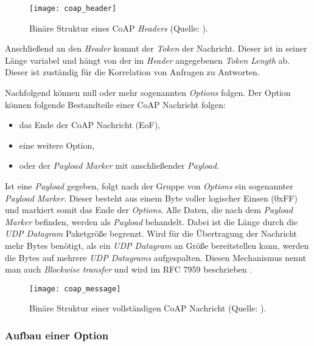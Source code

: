 \begin{figure}[h]
    \centering
    \texttt{[image: coap\_header]}
    \caption{Binäre Struktur eines CoAP \textit{Headers} (Quelle: \autocite{RFC7252}).}
    \label{fig:binaere-sturktur-eines-coap-headers}
\end{figure}

Anschließend an den \textit{Header} kommt der \textit{Token} der Nachricht. Dieser ist in seiner Länge variabel und hängt von der im \textit{Header} angegebenen \textit{Token Length} ab. Dieser ist zuständig für die Korrelation von Anfragen zu Antworten.

Nachfolgend können null oder mehr sogenannten \textit{Options} folgen. Der Option können folgende Bestandteile einer CoAP Nachricht folgen:
\begin{itemize}
    \item das Ende der CoAP Nachricht (EoF),
    \item eine weitere Option,
    \item oder der \textit{Payload Marker} mit anschließender \textit{Payload}.
\end{itemize}

Ist eine \textit{Payload} gegeben, folgt nach der Gruppe von \textit{Options} ein sogenannter \textit{Payload Marker}. Dieser besteht aus einem Byte voller logischer Einsen (0xFF) und markiert somit das Ende der \textit{Options}. Alle Daten, die nach dem \textit{Payload Marker} befinden, werden als \textit{Payload} behandelt. Dabei ist die Länge durch die \textit{UDP Datagram} Paketgröße begrenzt. Wird für die Übertragung der Nachricht mehr Bytes benötigt, als ein \textit{UDP Datagram} an Größe bereitstellen kann, werden die Bytes auf mehrere \textit{UDP Datagrams} aufgespalten. Diesen Mechanismus nennt man auch \textit{Blockwise transfer} und wird im RFC 7959 beschrieben \autocite{RFC7959}.

\begin{figure}[h]
    \centering
    \texttt{[image: coap\_message]}
    \caption{Binäre Struktur einer vollständigen CoAP Nachricht (Quelle: \autocite{RFC7252}).}
    \label{fig:binaere-sturktur-einer-vollstaendigen-coap-nachricht}
\end{figure}

\subsubsection{Aufbau einer Option}
\label{subsubsec:aufbau-einer-option}

